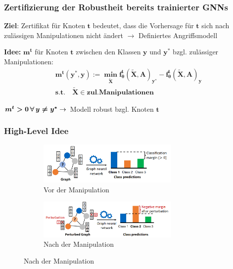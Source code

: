 \documentclass{beamer}
\begin{document}
\begin{frame}
  \frametitle{Zertifizierung der Robustheit bereits trainierter GNNs}

  \textbf{Ziel}: Zertifikat für Knoten $\boldsymbol{t}$ bedeutet, dass die Vorhersage für $\boldsymbol{t}$ sich nach zulässigen Manipulationen nicht ändert\newline
  $\rightarrow$ Definiertes Angriffsmodell\newline

  \textbf{Idee:}
   $\boldsymbol{m^t}$ für Knoten $\boldsymbol{t}$ zwischen den Klassen $\boldsymbol{y}$ und $\boldsymbol{y^{\ast}}$ 
  bzgl. zulässiger Manipulationen:
  \begin{gather} 
        \boldsymbol{m^t (y^*, y) := \min_{\tilde{X}} f_{\theta}^t(\tilde{X}, A)_{y^*} - f_{\theta}^t(\tilde{X}, A)_y} \nonumber \\
        \boldsymbol{s.t. \quad \tilde{X} \in zul. Manipulationen} \nonumber
  \end{gather}

  $\boldsymbol{m^t > 0 \thinspace \forall \thinspace y \neq y^{\ast}} \rightarrow $ Modell robust bzgl. Knoten $\boldsymbol{t}$

\end{frame}

\begin{frame}
  \frametitle{High-Level Idee}
  \begin{figure}[H]
    \centering
    \begin{subfigure}[b]{1\textwidth}
      \centering
      \includegraphics[width=0.75\textwidth]{img/before_pert.png}
      \caption*{Vor der Manipulation \cite{Zuegner_2019}}
    \end{subfigure}
    \par\bigskip
    \begin{subfigure}[b]{1\textwidth}
      \centering
      \includegraphics[width=0.75\textwidth]{img/after_pert.png}
      \caption*{Nach der Manipulation \cite{Zuegner_2019}}
    \end{subfigure}
  \end{figure}
\end{frame}
\end{document}

